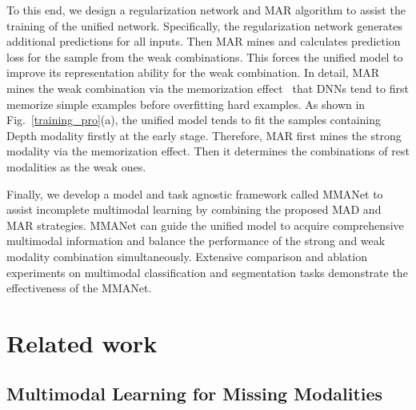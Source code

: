 \documentclass[10pt,twocolumn,letterpaper]{article}
\begin{document}
To this end, we design a regularization network and MAR algorithm to assist the training of the unified network. Specifically, the regularization network generates additional predictions for all inputs. Then MAR mines and calculates prediction loss for the sample from the weak combinations. This forces the unified model to improve its representation ability for the weak combination. In detail, MAR mines the weak combination via the memorization effect~\cite{mem1,mem2,mem3} that DNNs tend to first memorize simple examples before overfitting hard examples. As shown in Fig.~\ref{training_pro}(a), the unified model tends to fit the samples containing Depth modality firstly at the early stage. Therefore, MAR first mines the strong modality via the memorization effect. Then it determines the combinations of rest modalities as the weak ones.






Finally, we develop a model and task agnostic framework called MMANet to assist incomplete multimodal learning by combining the proposed MAD and MAR strategies. MMANet can guide the unified model to acquire comprehensive multimodal information and balance the performance of the strong and weak modality combination simultaneously. Extensive comparison and ablation experiments on multimodal classification and segmentation tasks demonstrate the effectiveness of the MMANet.








\section{Related work}

\subsection{Multimodal Learning for Missing Modalities}
\end{document}
